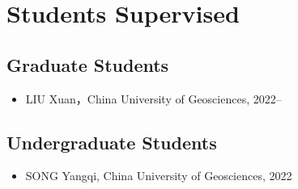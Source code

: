 \section{Students Supervised}

\subsection{Graduate Students}
\begin{itemize}
\item LIU Xuan，China University of Geosciences, 2022--
\end{itemize}

\subsection{Undergraduate Students}
\begin{itemize}
\item SONG Yangqi, China University of Geosciences, 2022
\end{itemize}
